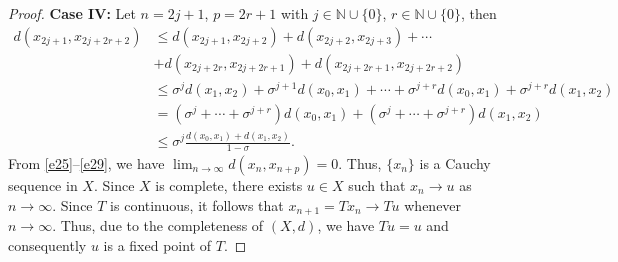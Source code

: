 \documentclass[10pt,a4paper]{amsart}
\begin{document}
\begin{proof}
\textbf{Case IV:} Let $n=2j+1$, $p=2r+1$ with $j \in \mathbb{N} \cup \{0\}$, $r \in \mathbb{N} \cup \{0\}$, then
\begin{align}\label{e29}
d(x_{2j+1},x_{2j+2r+2})
&\le d(x_{2j+1},x_{2j+2})+d(x_{2j+2},x_{2j+3})+\cdots\nonumber\\
&+d(x_{2j+2r},x_{2j+2r+1})+d(x_{2j+2r+1},x_{2j+2r+2})\nonumber\\
&\le \sigma^j d(x_1,x_2)+\sigma^{j+1} d(x_0,x_1)+\cdots+\sigma^{j+r} d(x_0,x_1)+\sigma^{j+r} d(x_1,x_2)\nonumber\\
&=(\sigma^j+\cdots+\sigma^{j+r})d(x_0,x_1)+(\sigma^j+\cdots+\sigma^{j+r})d(x_1,x_2)\nonumber\\
&\le \sigma^j \frac{d(x_0,x_1)+d(x_1,x_2)}{1-\sigma}.
\end{align}
From \eqref{e25}--\eqref{e29}, we have $\displaystyle \lim_{n \to \infty} d(x_n,x_{n+p})=0$. Thus, $\{x_n\}$ is a Cauchy sequence in $X$. Since $X$ is complete, there exists $u\in X$ such that $x_n \to u$ as $n \to \infty$. Since $T$ is continuous, it follows that $x_{n+1}=Tx_n\to Tu$ whenever $n\to \infty.$ Thus, due to the completeness of $(X,d)$, we have $Tu=u$ and consequently $u$ is a fixed point of $T$. 
\end{proof}
\end{document}
